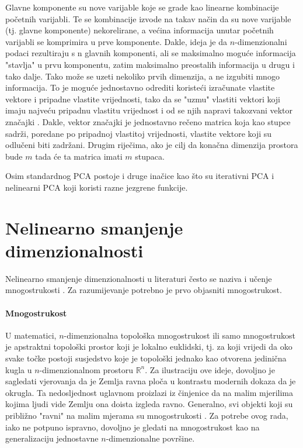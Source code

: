 \documentclass[times, utf8, diplomski]{fer}
\begin{document}
Glavne komponente su nove varijable koje se grade kao linearne kombinacije početnih varijabli. Te se kombinacije izvode na takav način da su nove varijable (tj. glavne komponente) nekorelirane, a većina informacija unutar početnih varijabli se komprimira u prve komponente. Dakle, ideja je da $n$-dimenzionalni podaci rezultiraju s n glavnih komponenti, ali se maksimalno moguće informacija "stavlja" u prvu komponentu, zatim maksimalno preostalih informacija u drugu i tako dalje. Tako može se uzeti nekoliko prvih dimenzija, a ne izgubiti mnogo informacija. To je moguće jednostavno odrediti koristeći izračunate vlastite vektore i pripadne vlastite vrijednosti, tako da se "uzmu" vlastiti vektori koji imaju najveću pripadnu vlastitu vrijednost i od se njih napravi takozvani vektor značajki . Dakle, vektor značajki je jednostavno rečeno matrica koja kao stupce sadrži, poredane po pripadnoj vlastitoj vrijednosti, vlastite vektore koji su odlučeni biti zadržani. Drugim riječima, ako je cilj da konačna dimenzija prostora bude $m$ tada će ta matrica imati $m$ stupaca.

Osim standardnog PCA postoje i druge inačice kao što su iterativni PCA i nelinearni PCA koji koristi razne jezgrene  funkcije.

\newpage
\section{Nelinearno smanjenje dimenzionalnosti}\label{sec:nonlin_reduc}

Nelinearno smanjenje dimenzionalnosti u literaturi često se naziva i učenje mnogostrukosti . Za razumijevanje potrebno je prvo objasniti mnogostrukost.

\paragraph{Mnogostrukost}
U matematici, $n$-dimenzionalna topološka mnogostrukost ili samo mnogostrukost je apstraktni topološki prostor koji je lokalno euklidski, tj. za koji vrijedi da oko svake točke postoji susjedstvo koje je topološki jednako kao otvorena jedinična kugla u $n$-dimenzionalnom prostoru $\mathbb{R}^n$. Za ilustraciju ove ideje, dovoljno je sagledati vjerovanja da je Zemlja ravna ploča u kontrastu modernih dokaza da je okrugla. Ta nedosljednost uglavnom proizlazi iz činjenice da na malim mjerilima kojima ljudi vide Zemlju ona doista izgleda ravno. Generalno, svi objekti koji su približno "ravni" na malim mjerama su mnogostrukosti \citep{rowland}.
Za potrebe ovog rada, iako ne potpuno ispravno, dovoljno je gledati na mnogostrukost kao na generalizaciju jednostavne $n$-dimenzionalne površine.
\end{document}
